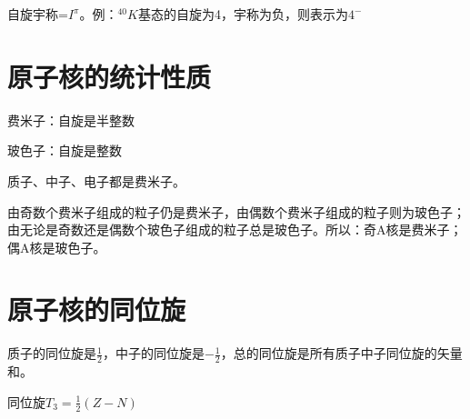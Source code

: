 自旋宇称=$I^{\pi}$。例：$^{40}K$基态的自旋为4，宇称为负，则表示为$4^{-}$

\section{原子核的统计性质}

费米子：自旋是半整数

玻色子：自旋是整数

质子、中子、电子都是费米子。

由奇数个费米子组成的粒子仍是费米子，由偶数个费米子组成的粒子则为玻色子；由无论是奇数还是偶数个玻色子组成的粒子总是玻色子。所以：奇A核是费米子；偶A核是玻色子。

\section{原子核的同位旋}

质子的同位旋是$\frac{1}{2}$，中子的同位旋是$-\frac{1}{2}$，总的同位旋是所有质子中子同位旋的矢量和。

同位旋$T_3 = \frac{1}{2}(Z-N)$

\clearpage